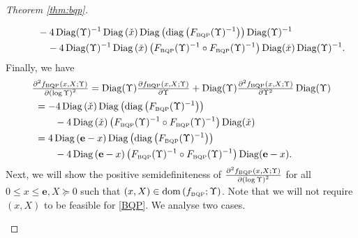 \documentclass[smallextended]{svjour3hack}       %
\DeclareMathOperator{\Diag}{Diag}
\DeclareMathOperator{\diag}{diag}
\DeclareMathOperator{\dom}{dom}
\begin{document}
\begin{proof}[Theorem \ref{thm:bqp}]
\begin{itemize}
\begin{align*}
        &~~~\quad -4 \Diag(\Upsilon)^{-1} \Diag\left(\check{x}\right) \Diag\left(\diag\left(F_{{\tiny\mbox{BQP}}}(\Upsilon)^{-1}\right)\right) \Diag(\Upsilon)^{-1} \\
        &~~~~~~\quad -4 \Diag(\Upsilon)^{-1} \Diag\left(\check{x}\right)   \left(F_{{\tiny\mbox{BQP}}}(\Upsilon)^{-1}\circ F_{{\tiny\mbox{BQP}}}(\Upsilon)^{-1}\right)\Diag(\check{x}) \Diag(\Upsilon)^{-1}.
    \end{align*}
   Finally, we have
    \begin{align*}
        &\textstyle\frac{\partial^2 f_{{\tiny\mbox{BQP}}}\left(x,X;\Upsilon\right)}{\partial \left(\log \Upsilon\right) ^2} =\Diag(\Upsilon) \textstyle\frac{\partial f_{{\tiny\mbox{BQP}}}\left(x,X;\Upsilon\right)}{\partial \Upsilon } + \Diag(\Upsilon)\frac{\partial^2 f_{{\tiny\mbox{BQP}}}\left(x,X;\Upsilon\right)}{\partial \Upsilon ^2 } \Diag(\Upsilon)\\
        & ~= -4 \Diag\left(\check{x}\right) \Diag\left(\diag\left(F_{{\tiny\mbox{BQP}}}(\Upsilon)^{-1}\right)\right) \\
        &~~~~\quad - 4  \Diag\left(\check{x}\right)   \left(F_{{\tiny\mbox{BQP}}}(\Upsilon)^{-1}\circ F_{{\tiny\mbox{BQP}}}(\Upsilon)^{-1}\right) \Diag(\check{x})\\
        &~ =4 \Diag\left(\mathbf{e}-x\right) \Diag\left(\diag\left(F_{{\tiny\mbox{BQP}}}(\Upsilon)^{-1}\right)\right) \\
        &~~~~\quad -4  \Diag\left(\mathbf{e}-x\right)   \left(F_{{\tiny\mbox{BQP}}}(\Upsilon)^{-1}\circ F_{{\tiny\mbox{BQP}}}(\Upsilon)^{-1}\right) \Diag(\mathbf{e}-x).
    \end{align*}
\smallskip
    Next, we will show the positive semidefiniteness of $\frac{\partial^2 f_{{\tiny\mbox{BQP}}}\left(x,X;\Upsilon\right)}{\partial \left(\log \Upsilon\right) ^2} $ for all $ 0\le x \le \mathbf{e}, X \succeq 0$ such that $(x,X) \in \dom\left(f_{{\tiny\mbox{BQP}}};\Upsilon\right)$. Note that we will not require $(x,X)$ to be feasible for \ref{BQP}. We analyse  two cases.


\end{itemize}
\end{proof}
\end{document}
